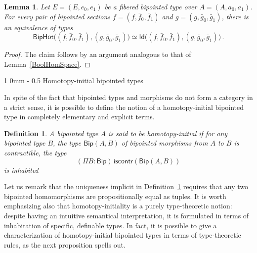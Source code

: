 \documentclass[reqno,10pt,a4paper,oneside]{amsart}
\makeatletter
\numberwithin{equation}{section}
\renewcommand{\section}{\@startsection
  {section}%
   {1}%
  {0mm}%
   {-\baselineskip}%
  {0.5\baselineskip}%
   {\Large\bfseries}}%
\theoremstyle{mythm}
\newtheorem{lemma}[theorem]{Lemma}
\theoremstyle{mydef}
\newtheorem{definition}[theorem]{Definition}
\theoremstyle{myrmk}
\newcommand{\ie}{\text{i.e.\ }}
\newcommand{\co}{\colon}
\newcommand{\iscontr}{\mathsf{iscontr}}
\newcommand{\Id}{\mathsf{Id}}
\newcommand{\Bip}{\mathsf{Bip}}
\newcommand{\BipHom}{\mathsf{Bip}}
\newcommand{\BipHot}{\mathsf{BipHot}}
\makeatother
\begin{document}
\begin{lemma} Let $E = (E, e_0, e_1)$ be a fibered bipointed type over $A = (A, a_0, a_1)$. 
For every pair of bipointed sections $f = (f, \bar{f}_0, \bar{f}_1)$ and $g = (g, \bar{g}_0, \bar{g}_1)$, 
there is an equivalence of types
\[
\BipHot \big( (f, \bar{f}_0, \bar{f}_1), (g, \bar{g}_0, \bar{g}_1) \big)
\simeq 
\Id\big( (f, \bar{f}_0, \bar{f}_1), (g, \bar{g}_0, \bar{g}_1) \big) \, .
\]
\end{lemma}


\begin{proof} The claim follows by an argument analogous to that of Lemma~\ref{BoolHomSpace}.
\end{proof}






\section{Homotopy-initial bipointed types}




 In spite of the fact that bipointed types and morphisms do not form a category in a strict sense, it is possible to define the notion of a homotopy-initial bipointed
type in completely elementary and explicit terms.


\begin{definition}\label{def:BoolInit}
A bipointed type $A$ is said to be \emph{homotopy-initial}  if for any bipointed type $B$, the type $\BipHom(A,B)$ of bipointed morphisms from $A$ to $B$
is contractible, \ie the type
\[
(\Pi B \co \Bip) \, \iscontr(\BipHom(A, B) ) 
\] 
is inhabited
\end{definition}

Let us remark that the uniqueness implicit in Definition~\ref{def:BoolInit} requires that any two bipointed homomorphisms are propositionally equal as tuples. It is worth emphasizing also that homotopy-initiality is a purely type-theoretic notion: despite having an intuitive semantical interpretation, it is formulated in terms of inhabitation of specific, definable types. In fact, it is possible to give a characterization of homotopy-initial bipointed types in terms of type-theoretic rules, as the next proposition spells out.
\end{document}
